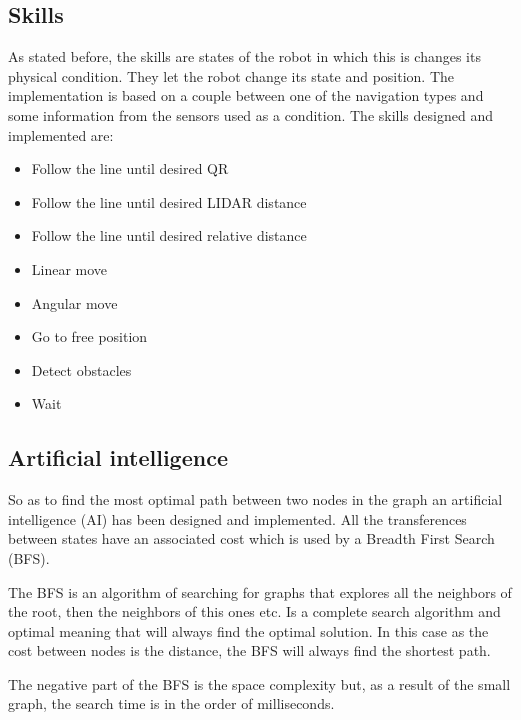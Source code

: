 
    \subsection{Skills} %
    \label{sub:skills}
    As stated before, the skills are states of the robot in which this is changes its physical condition.
    They let the robot change its state and position.
    The implementation is based on a couple between one of the navigation types and some information from the sensors used as a condition.
    The skills designed and implemented are:
    \begin{itemize}
        \item Follow the line until desired QR
        \item Follow the line until desired LIDAR distance
        \item Follow the line until desired relative distance
        \item Linear move
        \item Angular move
        \item Go to free position
        \item Detect obstacles
        \item Wait
    \end{itemize}

    \subsection{Artificial intelligence} %
    \label{sub:mr_artificial_intelligence}
    So as to find the most optimal path between two nodes in the graph an artificial intelligence (AI) has been designed and implemented.
    All the transferences between states have an associated cost which is used by a Breadth First Search (BFS).

    The BFS is an algorithm of searching for graphs that explores all the neighbors of the root, then the neighbors of this ones etc.
    Is a complete search algorithm and optimal meaning that will always find the optimal solution.
    In this case as the cost between nodes is the distance, the BFS will always find the shortest path.
    
    The negative part of the BFS is the space complexity but, as a result of the small graph, the search time is in the order of milliseconds.
